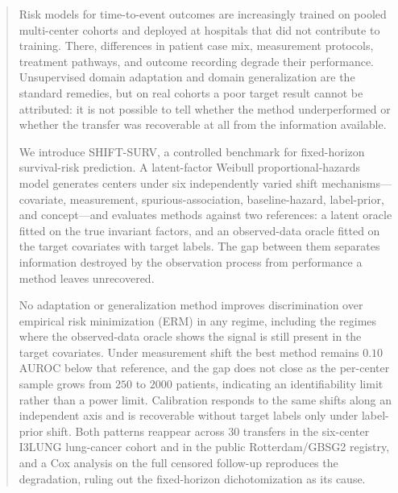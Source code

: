 %
%


\begin{abstract}
Risk models for time-to-event outcomes are increasingly trained on pooled
multi-center cohorts and deployed at hospitals that did not contribute to
training. There, differences in patient case mix, measurement protocols,
treatment pathways, and outcome recording degrade their performance.
Unsupervised domain adaptation and domain generalization are the standard
remedies, but on real cohorts a poor target result cannot be attributed: it is
not possible to tell whether the method underperformed or whether the transfer
was recoverable at all from the information available.

We introduce SHIFT-SURV, a controlled benchmark for fixed-horizon survival-risk
prediction. A latent-factor Weibull proportional-hazards model generates centers
under six independently varied shift mechanisms---covariate, measurement,
spurious-association, baseline-hazard, label-prior, and concept---and evaluates
methods against two references: a latent oracle fitted on the true invariant
factors, and an observed-data oracle fitted on the target covariates with target
labels. The gap between them separates information destroyed by the observation
process from performance a method leaves unrecovered.

No adaptation or generalization method improves discrimination over empirical
risk minimization (ERM) in any regime, including the regimes where the
observed-data oracle shows the signal is still present in the target covariates.
Under measurement shift the best method remains $0.10$ AUROC below that
reference, and the gap does not close as the per-center sample grows from $250$
to $2000$ patients, indicating an identifiability limit rather than a power
limit. Calibration responds to the same shifts along an independent axis and is
recoverable without target labels only under label-prior shift. Both patterns
reappear across $30$ transfers in the six-center I3LUNG lung-cancer cohort and in
the public Rotterdam/GBSG2 registry, and a Cox analysis on the full censored
follow-up reproduces the degradation, ruling out the fixed-horizon
dichotomization as its cause.
\end{abstract}


